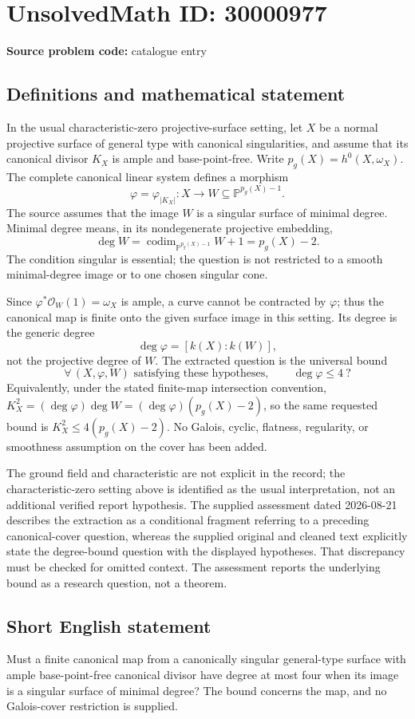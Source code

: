\documentclass[11pt]{article}
\newcommand{\PP}{\mathbb{P}}
\begin{document}
\section*{UnsolvedMath ID: 30000977}
\textbf{Source problem code:} catalogue entry
\subsection{Definitions and mathematical statement}
In the usual characteristic-zero projective-surface setting, let \(X\) be a normal projective surface of general type with canonical singularities, and assume that its canonical divisor \(K_X\) is ample and base-point-free. Write \(p_g(X)=h^0(X,\omega_X)\). The complete canonical linear system defines a morphism
\[
 \varphi=\varphi_{|K_X|}:X\longrightarrow
 W\subseteq\PP^{p_g(X)-1}.
\]
The source assumes that the image \(W\) is a singular surface of minimal degree. Minimal degree means, in its nondegenerate projective embedding,
\[
 \deg W=\operatorname{codim}_{\PP^{p_g(X)-1}}W+1=p_g(X)-2.
\]
The condition singular is essential; the question is not restricted to a smooth minimal-degree image or to one chosen singular cone.

Since \(\varphi^*\mathcal O_W(1)=\omega_X\) is ample, a curve cannot be contracted by \(\varphi\); thus the canonical map is finite onto the given surface image in this setting. Its degree is the generic degree
\[
 \deg\varphi=[k(X):k(W)],
\]
not the projective degree of \(W\). The extracted question is the universal bound
\[
 \forall\,(X,\varphi,W)\text{ satisfying these hypotheses},\qquad
 \deg\varphi\leq4\ ?
\]
Equivalently, under the stated finite-map intersection convention,
\(K_X^2=(\deg\varphi)\deg W=(\deg\varphi)(p_g(X)-2)\), so the same requested bound is \(K_X^2\leq4(p_g(X)-2)\). No Galois, cyclic, flatness, regularity, or smoothness assumption on the cover has been added.

The ground field and characteristic are not explicit in the record; the characteristic-zero setting above is identified as the usual interpretation, not an additional verified report hypothesis. The supplied assessment dated 2026-08-21 describes the extraction as a conditional fragment referring to a preceding canonical-cover question, whereas the supplied original and cleaned text explicitly state the degree-bound question with the displayed hypotheses. That discrepancy must be checked for omitted context. The assessment reports the underlying bound as a research question, not a theorem.
\subsection{Short English statement}
Must a finite canonical map from a canonically singular general-type surface with ample base-point-free canonical divisor have degree at most four when its image is a singular surface of minimal degree? The bound concerns the map, and no Galois-cover restriction is supplied.
\end{document}
